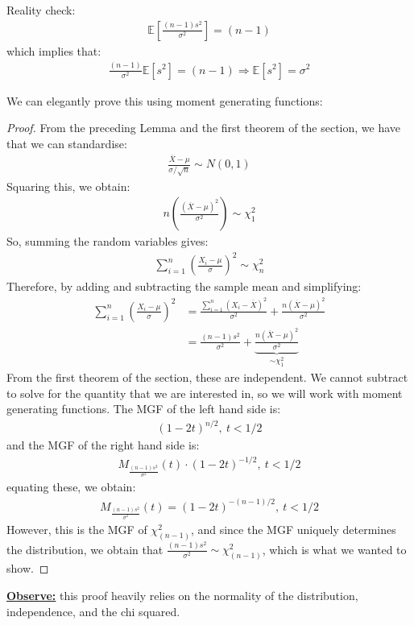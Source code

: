 \documentclass[11pt]{scrartcl}
\theoremstyle{definition}
\theoremstyle{remark}
\newcommand{\dfn}[1]{\textbf{\underline{#1}}}
\newcommand{\EX}[1]{\mathbb{E}\left[#1 \right]}
\begin{document}
{Reality check: \begin{align*}
 	\EX{ \frac{(n-1)s^2}{\sigma^2}} = (n-1) 
 \end{align*}
 which implies that: 
 \begin{align*}
 	\frac{(n-1)}{\sigma^2} \EX{s^2} = (n-1) \Rightarrow \EX{s^2} = \sigma^2	
 \end{align*}

We can elegantly prove this using moment generating functions: 
\begin{proof}
	From the preceding Lemma and the first theorem of the section, we have that we can standardise: 
	\begin{align*}
		\frac{\overline{X} - \mu}{\sigma / \sqrt{n} }	\sim N(0,1) 
	\end{align*}
	Squaring this, we obtain: 
	\begin{align*}
		n \left( 	\frac{(\overline{X} - \mu)^2}{\sigma^2}		\right) \sim \chi^2_1 	
	\end{align*}
	So, summing the random variables gives: 
	\begin{align*}
		\sum_{i=1}^n \left( 		\frac{X_i - \mu}{\sigma}	\right)^2 	\sim \chi_n^2
	\end{align*}
	 Therefore, by adding and subtracting the sample mean and simplifying: 
	 \begin{align*}
	 \sum_{i=1}^n \left( 		\frac{X_i - \mu}{\sigma}	\right)^2 &  = \frac{\sum_{i=1}^n (X_i - \overline{X})^2}{\sigma^2	} + \frac{n (\overline{X} - \mu)^2}{\sigma^2}	\\
	 	& = \frac{(n-1)s^2}{\sigma^2	} + \underbrace{\frac{n(\overline{X} - \mu)^2}{\sigma^2}}_{ \sim \chi_1^2} 
	 \end{align*}
		From the first theorem of the section, these are independent. We cannot subtract to solve for the quantity that we are interested in, so we will work with moment generating functions. The MGF of the left hand side is: 
		\begin{align*}
			(1 - 2t)^{n/2},\ t < 1/2	
		\end{align*}
		and the MGF of the right hand side is: 
		\begin{align*}
			M_{\frac{(n-1)s^2}{\sigma^2}} (t)  \cdot (1-2t)^{-1/2},\ t < 1/2 
		\end{align*}
		equating these, we obtain: 
		\begin{align*}
			M_{\frac{(n-1)s^2}{\sigma^2}} (t) 	= (1-2t)^{-(n-1)/2},\ t < 1/2
		\end{align*}
		However, this is the MGF of $\chi_{(n-1)}^2$, and since the MGF uniquely determines the distribution, we obtain that $\frac{(n-1)s^2}{\sigma^2} \sim \chi^2_{(n-1)}$, which is what we wanted to show. 
\end{proof}
\dfn{Observe:} this proof heavily relies on the normality of the distribution, independence, and the chi squared. 

}
\end{document}
